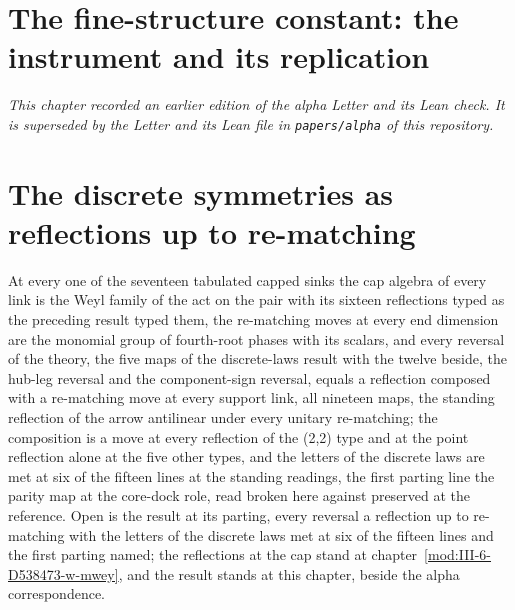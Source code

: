 \section{The fine-structure constant: the instrument and its replication}\label{mod:V-1-D538399-alpha-letter-release-thirty-eight}
\par\noindent\textit{This chapter recorded an earlier edition of the alpha Letter and its Lean check. It is superseded by the Letter and its Lean file in \texttt{papers/alpha} of this repository.}\par
\section{The discrete symmetries as reflections up to re-matching}\label{mod:V-1-D538789-w-dlrm}
\begin{chwall}\label{box:V-1-D538789-w-dlrm:1}
At every one of the seventeen tabulated capped sinks the cap algebra of every link is the Weyl family of the act on the pair with its sixteen reflections typed as the preceding result typed them, the re-matching moves at every end dimension are the monomial group of fourth-root phases with its scalars, and every reversal of the theory, the five maps of the discrete-laws result with the twelve beside, the hub-leg reversal and the component-sign reversal, equals a reflection composed with a re-matching move at every support link, all nineteen maps, the standing reflection of the arrow antilinear under every unitary re-matching; the composition is a move at every reflection of the (2,2) type and at the point reflection alone at the five other types, and the letters of the discrete laws are met at six of the fifteen lines at the standing readings, the first parting line the parity map at the core-dock role, read broken here against preserved at the reference.
Open is the result at its parting, every reversal a reflection up to re-matching with the letters of the discrete laws met at six of the fifteen lines and the first parting named; the reflections at the cap stand at chapter~\ref{mod:III-6-D538473-w-mwey}, and the result stands at this chapter, beside the alpha correspondence.
\end{chwall}
